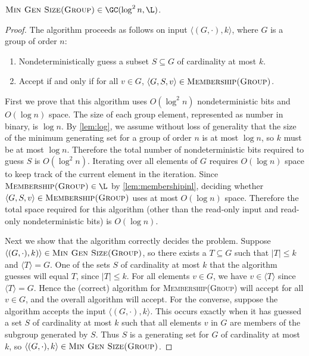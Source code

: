 \documentclass{article}
\newcommand{\gen}[1]{{\langle #1 \rangle}}
\begin{document}
\begin{theorem}\label{thm:mingengc}
  $\textsc{Min Gen Size(Group)} \in \GC(\log^2 n, \L)$.
\end{theorem}
\begin{proof}
  The algorithm proceeds as follows on input $\langle (G, \cdot), k \rangle$, where $G$ is a group of order $n$:
  \begin{enumerate}
  \item Nondeterministically guess a subset $S \subseteq G$ of cardinality at most $k$.
  \item Accept if and only if for all $v \in G$, $\langle G, S, v \rangle \in \textsc{Membership(Group)}$.
  \end{enumerate}

  First we prove that this algorithm uses $O(\log^2 n)$ nondeterministic bits and $O(\log n)$ space.
  The size of each group element, represented as number in binary, is $\log n$.
  By \autoref{lem:log}, we assume without loss of generality that the size of the minimum generating set for a group of order $n$ is at most $\log n$, so $k$ must be at most $\log n$.
  Therefore the total number of nondeterministic bits required to guess $S$ is $O(\log^2 n)$.
  Iterating over all elements of $G$ requires $O(\log n)$ space to keep track of the current element in the iteration.
  Since $\textsc{Membership(Group)} \in \L$ by \autoref{lem:membershipinl}, deciding whether $\langle G, S, v \rangle \in \textsc{Membership(Group)}$ uses at most $O(\log n)$ space.
  Therefore the total space required for this algorithm (other than the read-only input and read-only nondeterministic bits) is $O(\log n)$.

  Next we show that the algorithm correctly decides the problem.
  Suppose $\langle (G, \cdot), k) \rangle \in \textsc{Min Gen Size(Group)}$, so there exists a $T \subseteq G$ such that $|T| \leq k$ and $\gen{T} = G$.
  One of the sets $S$ of cardinality at most $k$ that the algorithm guesses will equal $T$, since $|T| \leq k$.
  For all elements $v \in G$, we have $v \in \gen{T}$ since $\gen{T} = G$.
  Hence the (correct) algorithm for \textsc{Membership(Group)} will accept for all $v \in G$, and the overall algorithm will accept.
  For the converse, suppose the algorithm accepts the input $\langle (G, \cdot), k \rangle$.
  This occurs exactly when it has guessed a set $S$ of cardinality at most $k$ such that all elements $v$ in $G$ are members of the subgroup generated by $S$.
  Thus $S$ is a generating set for $G$ of cardinality at most $k$, so $\langle (G, \cdot), k \rangle \in \textsc{Min Gen Size(Group)}$.
\end{proof}
\end{document}
